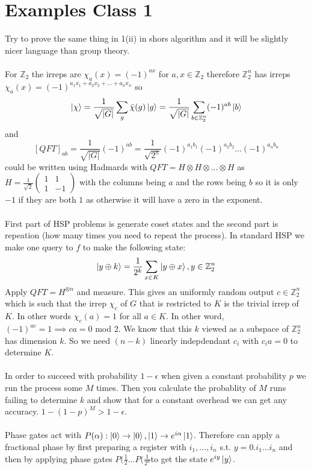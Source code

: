 \documentclass{article}
\begin{document}
\section{Examples Class 1}
Try to prove the same thing in 1(ii) in shors algorithm and it will be slightly nicer language than group theory.\\\\
For $\mathbb{Z}_2$ the irreps are $\chi_a(x) = (-1)^{ax}$ for $a, x \in \mathbb{Z}_2$ therefore $\mathbb{Z}_2^n$ has irreps $\chi_a(x) = (-1)^{a_1 x_1 + a_2 x_2 +...+ a_n x_n}$ so
$$
\ket{\chi} = \frac{1}{\sqrt{|G|}} \sum_g \bar \chi( g) \ket{g} = \frac{1}{\sqrt{|G|}} \sum_{b \in \mathbb{Z}_2^n} (-1)^{a b} \ket{b}
$$
and
$$
[QFT]_{ab} = \frac{1}{\sqrt{|G|}} (-1)^{ab} = \frac{1}{\sqrt{2^n}} (-1)^{a_1 b_1} (-1)^{a_2 b_2} ... (-1)^{a_n b_n}
$$
                       could be written using Hadmards with $QFT = H \otimes H \otimes... \otimes H$ as $H = \frac{1}{\sqrt{2}}\begin{pmatrix} 1 & 1\\ 1& -1 \end{pmatrix}$ with the columns being $a$ and the rows being $b$ so it is only $-1$ if they are both $1$ as otherwise it will have a zero in the exponent.
\\\\
First part of HSP problems is generate coset states and the second part is repeation (how many times you need to repeat the process). In standard HSP we make one query to $f$ to make the following state:
$$
\ket{y \oplus k} = \frac{1}{2^k} \sum_{x \in K} \ket{y \oplus x}, y \in \mathbb{Z}_2^n
$$
Apply $QFT =  H^{\otimes n}$ and measure. This gives an uniformly random output $c \in \mathbb{Z}_2^n$ which is such that the irrep $\chi_c$ of $G$ that is restricted to $K$ is the trivial irrep of $K$. In other words $\chi_c(a) = 1$ for all $a \in K$. In other word, $(-1)^{ac} = 1 \implies c a = 0$ mod 2. We know that this $k$ viewed as a subspace of $\mathbb{Z}_2^n$ has dimension $k$. So we need $(n-k)$ linearly indepdendant $c_i$ with $c_i a = 0$ to determine $K$.\\\\
In order to succeed with probability $1- \epsilon$ when given a constant probability $p$ we run the process some $M$ times. Then you calculate the probablity of $M$ runs failing to determine $k$ and show that for a constant overhead we can get any accuracy. $1- (1-p)^M > 1- \epsilon$.\\\\
Phase gates act with $P(\alpha) : \ket{0} \rightarrow \ket{0}, \ket{1} \rightarrow e^{i \alpha}\ket{1}$. Therefore can apply a fractional phase by first preparing a register with $i_1,...,i_n$ s.t. $y= 0.i_1...i_n$ and then by applying phase gates $P(\frac{1}{2}...P(\frac{1}{2^n}$to get the state $e^{iy}\ket{y}$.\\\\
\end{document}
